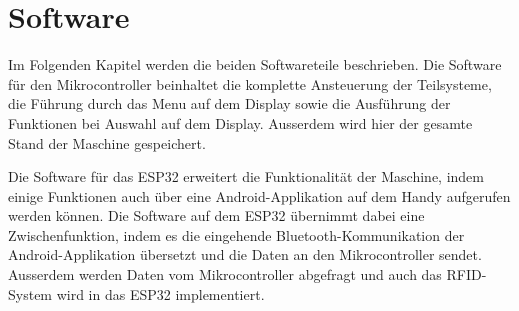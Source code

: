 \newpage
\section{Software}
\label{sec:Software}

Im Folgenden Kapitel werden die beiden Softwareteile beschrieben. Die Software für den Mikrocontroller beinhaltet die komplette Ansteuerung der Teilsysteme, die Führung durch das Menu auf dem Display sowie die Ausführung der Funktionen bei Auswahl auf dem Display. Ausserdem wird hier der gesamte Stand der Maschine gespeichert.

Die Software für das ESP32 erweitert die Funktionalität der Maschine, indem einige Funktionen auch über eine Android-Applikation auf dem Handy aufgerufen werden können. Die Software auf dem ESP32 übernimmt dabei eine Zwischenfunktion, indem es die eingehende Bluetooth-Kommunikation der Android-Applikation übersetzt und die Daten an den Mikrocontroller sendet. Ausserdem werden Daten vom Mikrocontroller abgefragt und auch das RFID-System wird in das ESP32 implementiert.